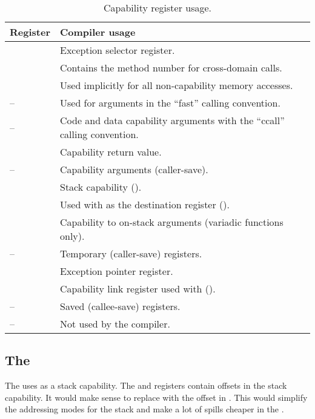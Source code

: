 \begin{table}
	\begin{center}
		\begin{tabu}{ll}
			\toprule
			\headerrow
			Register             & Compiler usage \\
			\midrule
			             & Exception selector register. \\
			             & Contains the method number for cross-domain calls.\\
			             & Used implicitly for all non-capability memory accesses.\\
			--  & Used for arguments in the ``fast'' calling convention. \\
			--   & Code and data capability arguments with the ``ccall'' calling convention. \\
			             & Capability return value. \\
			--  & Capability arguments (caller-save). \\
			            & Stack capability (\sandboxABI{}). \\
			            & Used with  as the destination register (\sandboxABI{}). \\
			            & Capability to on-stack arguments (variadic functions only). \\
			-- & Temporary (caller-save) registers.\\
			            & Exception pointer register. \\
			            & Capability link register used with  (\sandboxABI{}).\\
			-- & Saved (callee-save) registers. \\
			-- & Not used by the compiler.\\
			\bottomrule
		\end{tabu}
		\caption{\label{tbl:reguse}Capability register usage.}
	\end{center}
\end{table}

\subsection{The \sandboxABI{}}

The \sandboxABI{} uses  as a stack capability.
The  and  registers contain offsets in the stack capability.
It would make sense to replace  with the offset in .
This would simplify the addressing modes for the stack and make a lot of spills cheaper in the \sandboxABI{}.

